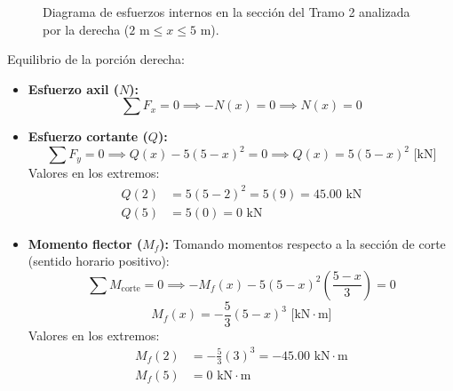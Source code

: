 \begin{figure}[H]
{%
    }
    \caption{Diagrama de esfuerzos internos en la sección del Tramo 2 analizada por la derecha ($2\text{ m} \le x \le 5\text{ m}$).}
    \label{fig:ejemplo11_corte2}
\end{figure}

Equilibrio de la porción derecha:
\begin{itemize}
    \item \textbf{Esfuerzo axil ($N$):}
          \begin{equation}
              \sum F_x = 0 \implies -N(x) = 0 \implies \boxed{N(x) = 0}
          \end{equation}
    \item \textbf{Esfuerzo cortante ($Q$):}
          \begin{equation}
              \sum F_y = 0 \implies Q(x) - 5(5 - x)^2 = 0 \implies \boxed{Q(x) = 5(5 - x)^2\text{ [kN]}}
          \end{equation}
          Valores en los extremos:
          \begin{align*}
              Q(2) & = 5(5 - 2)^2 = 5(9) = 45.00\text{ kN} \\
              Q(5) & = 5(0) = 0\text{ kN}
          \end{align*}
    \item \textbf{Momento flector ($M_f$):}
          Tomando momentos respecto a la sección de corte (sentido horario positivo):
          \begin{equation}
              \sum M_{\text{corte}} = 0 \implies -M_f(x) - 5(5 - x)^2 \left(\frac{5 - x}{3}\right) = 0
          \end{equation}
          \begin{equation}
              \boxed{M_f(x) = -\frac{5}{3}(5 - x)^3\text{ [kN}\cdot\text{m]}}
          \end{equation}
          Valores en los extremos:
          \begin{align*}
              M_f(2) & = -\frac{5}{3}(3)^3 = -45.00\text{ kN}\cdot\text{m} \\
              M_f(5) & = 0\text{ kN}\cdot\text{m}
          \end{align*}
\end{itemize}



